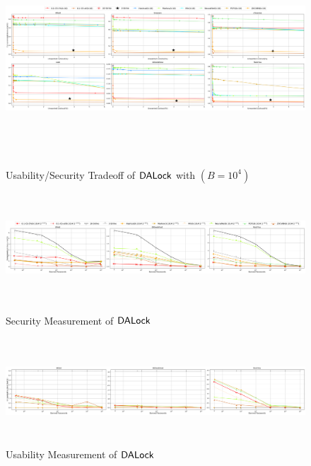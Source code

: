 

\begin{figure}[h]
	\includegraphics[width=\linewidth, height = 8cm]{Figures/Experiments/B10000.png}
		\vspace{-0.25in}
	\caption{Usability/Security Tradeoff of $\mathsf{DALock}$ with $(B=10^4)$ }
	\label{figure:UseSecTradeoff}
	\vspace{-0.2in}
	\end{figure}
	\begin{figure}[h]
	\includegraphics[width=\linewidth, height = 4cm]{Figures/Experiments/Attacker/SecurityBigPicture.png}
	\vspace{-0.25in}
	\caption{Security Measurement of $\mathsf{DALock}$ }\label{figure:Security}
	\includegraphics[width=\linewidth, height = 4cm]{Figures/Experiments/Utility/UsabilityBigPicture.png}
	\vspace{-0.25in}
	\caption{Usability Measurement of $\mathsf{DALock}$ }\label{figure:Usability}
	\vspace{-0.25in}
\end{figure}









